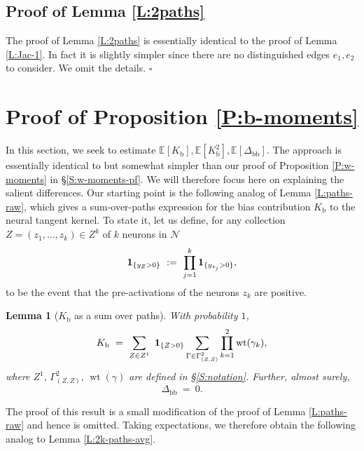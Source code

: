 \documentclass[11pt, reqno]{amsart}
\newtheorem{lemma}[theorem]{Lemma}
\newcommand{\E}[1]{{\mathbb E}\left [#1\right]}
\newcommand{\lr}[1]{\ensuremath{\left(#1 \right)}}
\newcommand{\set}[1]{\ensuremath{\{#1\}}}
\newcommand{\mN}{\mathcal N}
\newcommand{\Kb}{K_{\mathrm{b}}}
\newcommand{\Dbb}{\Delta_{\mathrm{bb}}}
\DeclareMathOperator{\wt}{wt}
\begin{document}
 

\subsection{Proof of Lemma \ref{L:2paths}}\label{S:2path-pf} The proof of Lemma \ref{L:2paths} is essentially identical to the proof of Lemma \ref{L:Jac-1}. In fact it is slightly simpler since there are no distinguished edges $e_1,e_2$ to consider. We omit the details. \hfill $\square$

\section{Proof of Proposition \ref{P:b-moments}}\label{S:b-moments-pf}
In this section, we seek to estimate $\E{\Kb},\E{\Kb^2},\E{\Dbb}$. The approach is essentially identical to but somewhat simpler than our proof of Proposition \ref{P:w-moments} in \S \ref{S:w-moments-pf}. We will therefore focus here on explaining the salient differences. Our starting point is the following analog of Lemma \ref{L:paths-raw}, which gives a sum-over-paths expression for the bias contribution $\Kb$ to the neural tangent kernel. To state it, let us define, for any collection $Z=\lr{z_1,\ldots,z_k}\in Z^k$ of $k$ neurons in $\mN$
\[{\bf 1}_{\set{y_Z>0}} ~:=~\prod_{j=1}^k{\bf 1}_{\set{y_{z_j}>0}},\]
to be the event that the pre-activations of the neurons $z_k$ are positive.
\begin{lemma}[$\Kb$ as a sum over paths]\label{L:bias-paths-raw}
With probability $1$, 
  \begin{equation}\label{E:bias-paths}
\Kb~=~\sum_{Z\in Z^1}  ~{\bf 1}_{\set{Z>0}}\sum_{\Gamma\in \Gamma_{(Z,Z)}^2} \prod_{k=1}^2\wt(\gamma_k),
\end{equation}
where $Z^1, \, \Gamma_{(Z,Z)}^2,\, \wt(\gamma)$ are defined in \S \ref{S:notation}. Further, almost surely,
  \begin{equation}\label{E:delta-b-paths}
\Dbb~=~0.%
\end{equation}
\end{lemma}
The proof of this result is a small modification of the proof of Lemma \ref{L:paths-raw} and hence is omitted. Taking expectations, we therefore obtain the following analog to Lemma \ref{L:2k-paths-avg}.
\end{document}
